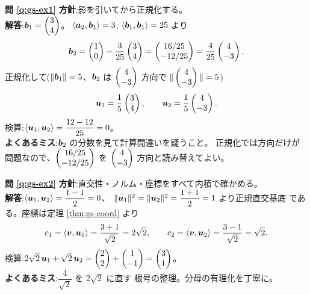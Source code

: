 \bigskip
\noindent\textbf{問 \ref{q:gs-ex1}}\quad
\textbf{方針}:影を引いてから正規化する。\\
\textbf{解答}:$\bm{b}_1 = \begin{pmatrix}3 \\ 4\end{pmatrix}$。
$\langle \bm{a}_2, \bm{b}_1 \rangle = 3$,
$\langle \bm{b}_1, \bm{b}_1 \rangle = 25$ より
\[
\bm{b}_2 = \begin{pmatrix}1 \\ 0\end{pmatrix} - \frac{3}{25}\begin{pmatrix}3 \\ 4\end{pmatrix}
= \begin{pmatrix}16/25 \\ -12/25\end{pmatrix} = \frac{4}{25}\begin{pmatrix}4 \\ -3\end{pmatrix}.
\]
正規化して($\|\bm{b}_1\| = 5$、$\bm{b}_2$ は $\begin{pmatrix}4 \\ -3\end{pmatrix}$ 方向で
$\|\begin{pmatrix}4 \\ -3\end{pmatrix}\| = 5$)
\[
\bm{u}_1 = \frac{1}{5}\begin{pmatrix}3 \\ 4\end{pmatrix}, \qquad
\bm{u}_2 = \frac{1}{5}\begin{pmatrix}4 \\ -3\end{pmatrix}.
\]
検算:$\langle \bm{u}_1, \bm{u}_2 \rangle = \dfrac{12 - 12}{25} = 0$。\\
\textbf{よくあるミス}:$\bm{b}_2$ の分数を見て計算間違いを疑うこと。
正規化では方向だけが問題なので、$\begin{pmatrix}16/25 \\ -12/25\end{pmatrix}$ を
$\begin{pmatrix}4 \\ -3\end{pmatrix}$ 方向と読み替えてよい。

\bigskip
\noindent\textbf{問 \ref{q:gs-ex2}}\quad
\textbf{方針}:直交性・ノルム・座標をすべて内積で確かめる。\\
\textbf{解答}:$\langle \bm{u}_1, \bm{u}_2 \rangle = \dfrac{1 - 1}{2} = 0$、
$\|\bm{u}_1\|^2 = \|\bm{u}_2\|^2 = \dfrac{1 + 1}{2} = 1$ より正規直交基底
である。座標は定理 \ref{thm:gs-coord} より
\[
c_1 = \langle \bm{v}, \bm{u}_1 \rangle = \frac{3 + 1}{\sqrt{2}} = 2\sqrt{2},
\qquad
c_2 = \langle \bm{v}, \bm{u}_2 \rangle = \frac{3 - 1}{\sqrt{2}} = \sqrt{2}.
\]
検算:$2\sqrt{2}\,\bm{u}_1 + \sqrt{2}\,\bm{u}_2
= \begin{pmatrix}2 \\ 2\end{pmatrix} + \begin{pmatrix}1 \\ -1\end{pmatrix} = \begin{pmatrix}3 \\ 1\end{pmatrix}$。\\
\textbf{よくあるミス}:$\dfrac{4}{\sqrt{2}}$ を $2\sqrt{2}$ に直す
根号の整理。分母の有理化を丁寧に。

